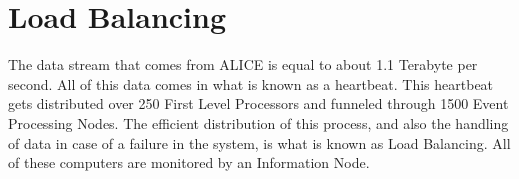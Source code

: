 \section{Load Balancing}
The data stream that comes from ALICE is equal to about 1.1 Terabyte per second. All of this data comes in what is known as a heartbeat. This heartbeat gets distributed over 250 First Level Processors and funneled through	1500 Event Processing Nodes. The efficient distribution of this process, and also the handling of data in case of a failure in the system, is what is known as Load Balancing. All of these computers are monitored by an Information Node.